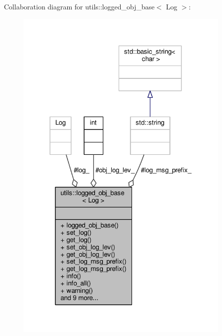 Collaboration diagram for utils\-:\-:logged\-\_\-obj\-\_\-base$<$ Log $>$\-:\nopagebreak
\begin{figure}[H]
\begin{center}
\leavevmode
\includegraphics[width=295pt]{classutils_1_1logged__obj__base__coll__graph}
\end{center}
\end{figure}
